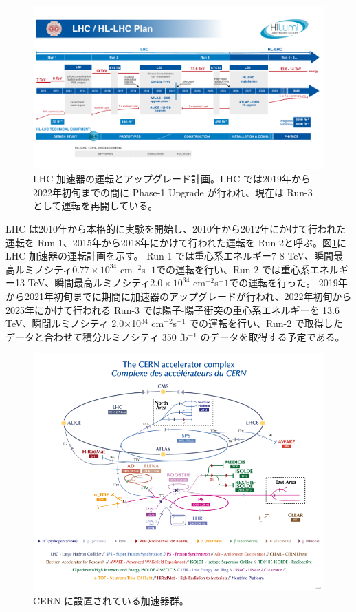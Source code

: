 \begin{figure}[tb]
  \centering
  \includegraphics[clip, width=14cm]{fig/1/HL-LHC_Janvier2022.pdf}
  \caption{LHC 加速器の運転とアップグレード計画。LHC では2019年から2022年初旬までの間に Phase-1 Upgrade が行われ、現在は Run-3 として運転を再開している。}
  \label{fig:LHC_Plan}
\end{figure}

LHC は2010年から本格的に実験を開始し、2010年から2012年にかけて行われた運転を Run-1、2015年から2018年にかけて行われた運転を Run-2と呼ぶ。図\ref{fig:LHC_Plan}に LHC 加速器の運転計画を示す。
Run-1 では重心系エネルギー7-8 TeV、瞬間最高ルミノシティ$0.77\times10^{34}$ cm$^{-2}$s${^-1}$での運転を行い、Run-2 では重心系エネルギー13 TeV、瞬間最高ルミノシティ$2.0\times10^{34}$ cm$^{-2}$s${^-1}$での運転を行った。
2019年から2021年初旬までに期間に加速器のアップグレードが行われ、2022年初旬から2025年にかけて行われる Run-3 では陽子-陽子衝突の重心系エネルギーを 13.6 TeV、瞬間ルミノシティ 2.0$\times$10$^{34}$ cm$^{−2}$s$^{−1}$ での運転を行い、Run-2 で取得したデータと合わせて積分ルミノシティ 350 fb$^{−1}$ のデータを取得する予定である。

\begin{figure}[tb]
  \centering
  \includegraphics[clip, width=14cm]{fig/2/CCC-v2022.pdf}
  \caption{CERN に設置されている加速器群。}
  \label{fig:LHC加速器}
\end{figure}


